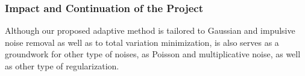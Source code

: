 \documentclass[enabledeprecatedfontcommands,cleardoublepage=empty,headsepline,twoside,11pt,DIV=15,BCOR=12mm,final]{scrartcl}
\begin{document}
\subsubsection*{Impact and Continuation of the Project}


Although our proposed adaptive method is tailored to Gaussian and impulsive noise removal as well as to total variation minimization, is also serves as a groundwork for other type of noises, as Poisson and multiplicative noise, as well as other type of regularization.

\end{document}
